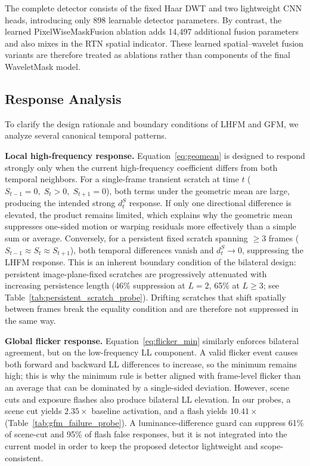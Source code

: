 The complete detector consists of the fixed Haar DWT and two lightweight CNN heads, introducing only 898 learnable detector parameters. By contrast, the learned PixelWiseMaskFusion ablation adds 14,497 additional fusion parameters and also mixes in the RTN spatial indicator. These learned spatial--wavelet fusion variants are therefore treated as ablations rather than components of the final WaveletMask model.

\subsection{Response Analysis}\label{subsec:response_analysis}

To clarify the design rationale and boundary conditions of LHFM and GFM, we analyze several canonical temporal patterns.

\textbf{Local high-frequency response.} Equation~\eqref{eq:geomean} is designed to respond strongly only when the current high-frequency coefficient differs from both temporal neighbors. For a single-frame transient scratch at time $t$ ($S_{t-1}=0,\;S_t>0,\;S_{t+1}=0$), both terms under the geometric mean are large, producing the intended strong $d_t^S$ response. If only one directional difference is elevated, the product remains limited, which explains why the geometric mean suppresses one-sided motion or warping residuals more effectively than a simple sum or average. Conversely, for a persistent fixed scratch spanning $\geq$3 frames ($S_{t-1}\approx S_t\approx S_{t+1}$), both temporal differences vanish and $d_t^S\to0$, suppressing the LHFM response. This is an inherent boundary condition of the bilateral design: persistent image-plane-fixed scratches are progressively attenuated with increasing persistence length (46\% suppression at $L=2$, 65\% at $L\geq3$; see Table~\ref{tab:persistent_scratch_probe}). Drifting scratches that shift spatially between frames break the equality condition and are therefore not suppressed in the same way.

\textbf{Global flicker response.} Equation~\eqref{eq:flicker_min} similarly enforces bilateral agreement, but on the low-frequency LL component. A valid flicker event causes both forward and backward LL differences to increase, so the minimum remains high; this is why the minimum rule is better aligned with frame-level flicker than an average that can be dominated by a single-sided deviation. However, scene cuts and exposure flashes also produce bilateral LL elevation. In our probes, a scene cut yields $2.35\times$ baseline activation, and a flash yields $10.41\times$ (Table~\ref{tab:gfm_failure_probe}). A luminance-difference guard can suppress 61\% of scene-cut and 95\% of flash false responses, but it is not integrated into the current model in order to keep the proposed detector lightweight and scope-consistent.

